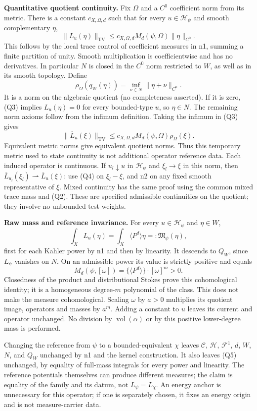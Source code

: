 \documentclass[
  11pt,
]{article}
\begin{document}
\textbf{Quantitative quotient continuity.} Fix \(\Omega\) and a \(C^0\)
coefficient norm from its metric. There is a constant \(c_{X,\Omega,d}\)
such that for every \(u\in\mathcal{H}_\psi\) and smooth complementary
\(\eta\), \[
\|L_u(\eta)\|_{\mathrm{TV}}\leq c_{X,\Omega,d}M_d(\psi,\Omega)\|\eta\|_{C^0}. \tag{Q3}
\] This follows by the local trace control of coefficient measures in
n1, summing a finite partition of unity. Smooth multiplication is
coefficientwise and has no derivatives. In particular \(N\) is closed in
the \(C^0\) norm restricted to \(W\), as well as in its smooth topology.
Define \[
\rho_\Omega(q_W(\eta))=\inf_{\nu\in N}\|\eta+\nu\|_{C^0}.
\] It is a norm on the algebraic quotient (no completeness asserted). If
it is zero, (Q3) implies \(L_u(\eta)=0\) for every bounded-type \(u\),
so \(\eta\in N\). The remaining norm axioms follow from the infimum
definition. Taking the infimum in (Q3) gives \[
\|\overline L_u(\xi)\|_{\mathrm{TV}}\leq c_{X,\Omega,d}M_d(\psi,\Omega)\rho_\Omega(\xi). \tag{Q4}
\] Equivalent metric norms give equivalent quotient norms. Thus this
temporary metric used to state continuity is not additional operator
reference data. Each induced operator is continuous. If
\(u_l\downarrow u\) in \(\mathcal{H}_\psi\) and \(\xi_l\to\xi\) in this
norm, then
\(\overline L_{u_l}(\xi_l)\rightharpoonup\overline L_u(\xi)\): use (Q4)
on \(\xi_l-\xi\), and n2 on any fixed smooth representative of \(\xi\).
Mixed continuity has the same proof using the common mixed trace mass
and (Q2). These are specified admissible continuities on the quotient;
they involve no unbounded test weights.

\textbf{Raw mass and reference invariance.} For every
\(u\in\mathcal{H}_\psi\) and \(\eta\in W\), \[
\int_X L_u(\eta)=\int_X\langle P^d\rangle\eta=:\mathfrak M_\psi(\eta), \tag{Q5}
\] first for each Kahler power by n1 and then by linearity. It descends
to \(Q_W\), since \(L_\psi\) vanishes on \(N\). On an admissible power
its value is strictly positive and equals \[
M_d(\psi,[\omega])=\{\langle P^d\rangle\}\cdot[\omega]^m>0.
\] Closedness of the product and distributional Stokes prove this
cohomological identity; it is a homogeneous degree-\(m\) polynomial of
the class. This does not make the measure cohomological. Scaling
\(\omega\) by \(a>0\) multiplies its quotient image, operators and
masses by \(a^m\). Adding a constant to \(u\) leaves its current and
operator unchanged. No division by \(\operatorname{vol}(\alpha)\) or by
this positive lower-degree mass is performed.

Changing the reference from \(\psi\) to a bounded-equivalent \(\chi\)
leaves \(\mathcal{C}\), \(\mathcal{H}\), \(\mathcal{F}^1\), \(d\), \(W\),
\(N\), and \(Q_W\) unchanged by n1 and the kernel construction. It also
leaves (Q5) unchanged, by equality of full-mass integrals for every
power and linearity. The reference potentials themselves can produce
different measures; the claim is equality of the family and its datum,
not \(L_\psi=L_\chi\). An energy anchor is unnecessary for this
operator; if one is separately chosen, it fixes an energy origin and is
not measure-carrier data.
\end{document}
